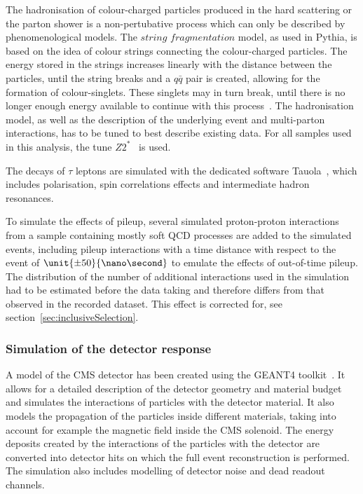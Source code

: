 The hadronisation of colour-charged particles produced in the hard scattering or the parton shower is a non-pertubative process which can only be described by phenomenological models. The $\textit{string fragmentation}$ model, as used in Pythia, is based on the idea of colour strings connecting the colour-charged particles. The energy stored in the strings increases linearly with the distance between the  particles, until the string breaks and a $q\bar{q}$ pair is created, allowing for the formation of colour-singlets. These singlets may in turn break, until there is no longer enough energy available to continue with this process~\cite{Pythia}. The hadronisation model, as well as the description of the underlying event and multi-parton interactions, has to be tuned to best describe existing data. For all samples used in this analysis, the tune $Z2^{*}$~\cite{Field:2011iq} is used. 

The decays of $\tau$ leptons are simulated with the dedicated software Tauola~\cite{Jadach1993361}, which includes polarisation, spin correlations effects and intermediate hadron resonances. 

To simulate the effects of pileup, several simulated proton-proton interactions from a sample containing mostly soft QCD processes are added to the simulated events, including pileup interactions with a time distance with respect to the event of $\unit{\pm50}{\nano\second}$ to emulate the effects of out-of-time pileup. The distribution of the number of additional interactions used in the simulation had to be estimated before the data taking and therefore differs from that observed in the recorded dataset. This effect is corrected for, see section~\ref{sec:inclusiveSelection}.

\subsubsection{Simulation of the detector response}
A model of the CMS detector has been created using the GEANT4 toolkit~\cite{Agostinelli:2002hh}. It allows for a detailed description of the detector geometry and material budget and simulates the interactions of particles with the detector material. It also models the propagation of the particles inside different materials, taking into account for example the magnetic field inside the CMS solenoid. The energy deposits created by the interactions of the particles with the detector are converted into detector hits on which the full event reconstruction is performed. The simulation also includes modelling of detector noise and dead readout channels.  

